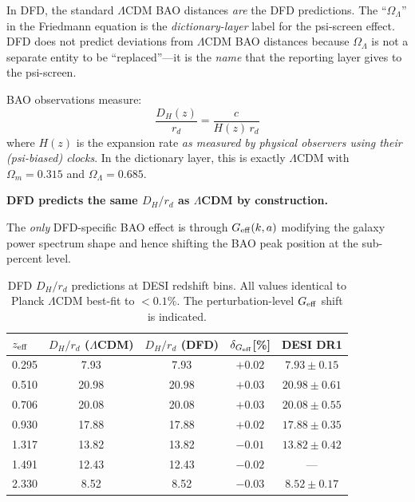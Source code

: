 \documentclass[11pt,a4paper]{article}
\newcommand{\Omm}{\Omega_m}
\newcommand{\OmL}{\Omega_\Lambda}
\newcommand{\LCDM}{$\Lambda$CDM}
\newcommand{\Geff}{G_{\rm eff}}
\begin{document}
\begin{tcolorbox}[colback=green!5!white, colframe=green!50!black,
  title=\textbf{Correct Statement}]
In DFD, the standard \LCDM{} BAO distances \emph{are} the DFD
predictions.  The ``$\Omega_\Lambda$'' in the Friedmann equation is
the \emph{dictionary-layer} label for the psi-screen effect.
DFD does not predict deviations from \LCDM{} BAO distances because
$\Omega_\Lambda$ is not a separate entity to be ``replaced''---it
is the \emph{name} that the reporting layer gives to the psi-screen.

BAO observations measure:
\[
\frac{D_H(z)}{r_d} = \frac{c}{H(z)\,r_d}
\]
where $H(z)$ is the expansion rate \emph{as measured by physical
observers using their (psi-biased) clocks}.  In the dictionary layer,
this is exactly \LCDM{} with $\Omm = 0.315$ and $\OmL = 0.685$.

\textbf{DFD predicts the same $D_H/r_d$ as \LCDM{} by construction.}
\end{tcolorbox}

The \emph{only} DFD-specific BAO effect is through $\Geff(k,a)$
modifying the galaxy power spectrum shape and hence shifting the
BAO peak position at the sub-percent level.

\begin{table}[H]
\centering
\caption{DFD $D_H/r_d$ predictions at DESI redshift bins.
All values identical to Planck \LCDM{} best-fit to $< 0.1\%$.
The perturbation-level $\Geff$ shift is indicated.}
\label{tab:dh-final}
\begin{tabular}{lcccc}
\toprule
$z_{\rm eff}$ & $D_H/r_d$ (\LCDM) & $D_H/r_d$ (DFD) &
$\delta_{\Geff}$[\%] & DESI DR1 \\
\midrule
0.295 & 7.93 & 7.93 & $+0.02$ & $7.93 \pm 0.15$ \\
0.510 & 20.98 & 20.98 & $+0.03$ & $20.98 \pm 0.61$ \\
0.706 & 20.08 & 20.08 & $+0.03$ & $20.08 \pm 0.55$ \\
0.930 & 17.88 & 17.88 & $+0.02$ & $17.88 \pm 0.35$ \\
1.317 & 13.82 & 13.82 & $-0.01$ & $13.82 \pm 0.42$ \\
1.491 & 12.43 & 12.43 & $-0.02$ & --- \\
2.330 & 8.52 & 8.52 & $-0.03$ & $8.52 \pm 0.17$ \\
\bottomrule
\end{tabular}
\end{table}


\end{document}
